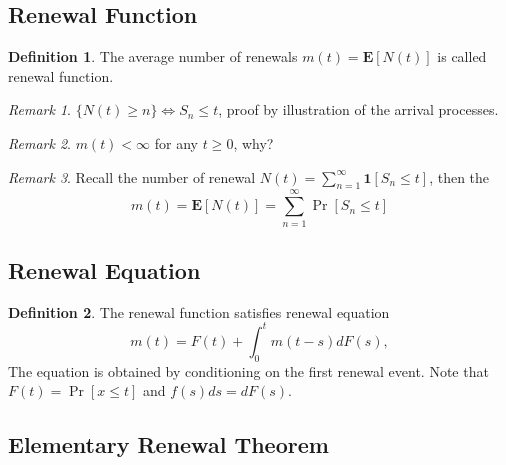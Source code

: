 \documentclass[11pt]{article}
\newcommand{\E}{\textbf{E}}
\newcommand{\cha}{\textbf{1}}
\theoremstyle{definition}
\newtheorem{definition}{Definition}[section]
\theoremstyle{remark}
\newtheorem*{remark}{Remark}
\begin{document}
    \subsection{Renewal Function}
        \begin{definition}
            The average number of renewals $m(t) = \E[N(t)]$ is called renewal function.
        \end{definition}
        \begin{remark}
            $\{N(t) \geq n\} \Leftrightarrow S_n \leq t$, proof by illustration of the arrival processes.
        \end{remark}
        \begin{remark}
            $m(t) < \infty$ for any $t \geq 0$, why?
        \end{remark}
        \begin{remark}
            Recall the number of renewal $N(t) = \sum_{n=1}^\infty \cha[S_n \leq t]$, then the 
            $$m(t) = \E[N(t)] = \sum_{n=1}^\infty \Pr[S_n \leq t]$$
        \end{remark}
    \subsection{Renewal Equation}
    \begin{definition}
        The renewal function satisfies renewal equation $$m(t) = F(t) + \int_0^t m(t-s) dF(s),$$
        The equation is obtained by conditioning on the first renewal event. Note that $F(t) = \Pr[x \leq t]$ and $f(s)ds = dF(s)$.
    \end{definition}
    \subsection{Elementary Renewal Theorem}
    \subsection{}
\end{document}
